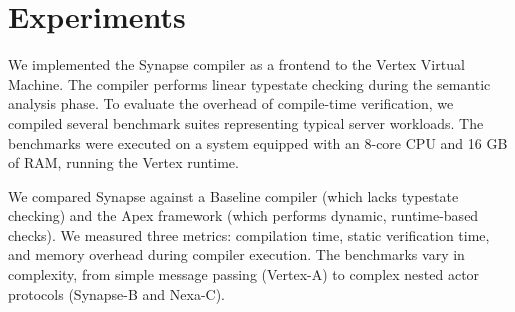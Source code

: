 \section{Experiments}
We implemented the Synapse compiler as a frontend to the Vertex Virtual Machine. The compiler performs linear typestate checking during the semantic analysis phase. To evaluate the overhead of compile-time verification, we compiled several benchmark suites representing typical server workloads. The benchmarks were executed on a system equipped with an 8-core CPU and 16 GB of RAM, running the Vertex runtime.

We compared Synapse against a Baseline compiler (which lacks typestate checking) and the Apex framework (which performs dynamic, runtime-based checks). We measured three metrics: compilation time, static verification time, and memory overhead during compiler execution. The benchmarks vary in complexity, from simple message passing (Vertex-A) to complex nested actor protocols (Synapse-B and Nexa-C).
